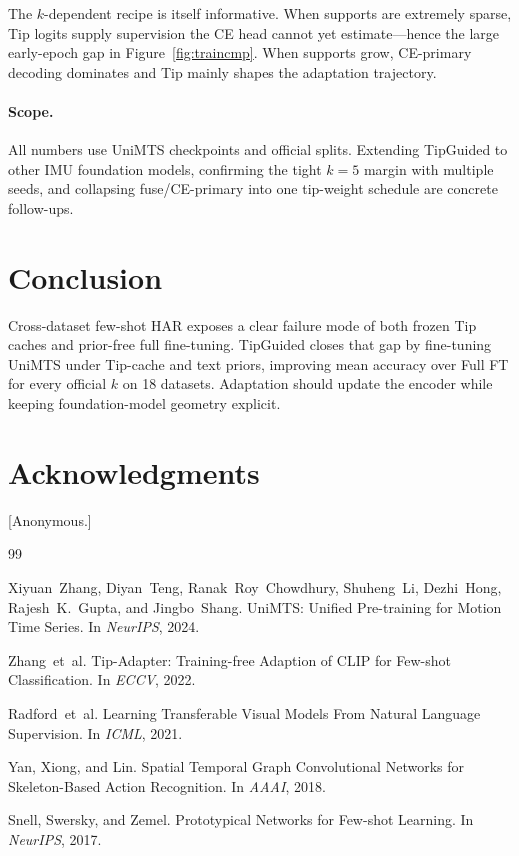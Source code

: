 \documentclass[11pt]{article}
\begin{document}
The \(k\)-dependent recipe is itself informative.
When supports are extremely sparse, Tip logits supply supervision the CE head cannot yet estimate---hence the large early-epoch gap in Figure~\ref{fig:traincmp}.
When supports grow, CE-primary decoding dominates and Tip mainly shapes the adaptation trajectory.

\paragraph{Scope.}
All numbers use UniMTS checkpoints and official splits.
Extending TipGuided to other IMU foundation models, confirming the tight \(k{=}5\) margin with multiple seeds, and collapsing fuse/CE-primary into one tip-weight schedule are concrete follow-ups.

\section{Conclusion}
\label{sec:conc}

Cross-dataset few-shot HAR exposes a clear failure mode of both frozen Tip caches and prior-free full fine-tuning.
TipGuided closes that gap by fine-tuning UniMTS under Tip-cache and text priors, improving mean accuracy over Full FT for every official \(k\) on 18 datasets.
Adaptation should update the encoder while keeping foundation-model geometry explicit.

\section*{Acknowledgments}
[Anonymous.]


\begin{thebibliography}{99}

Xiyuan~Zhang, Diyan~Teng, Ranak~Roy~Chowdhury, Shuheng~Li, Dezhi~Hong, Rajesh~K.~Gupta, and Jingbo~Shang.
\newblock UniMTS: Unified Pre-training for Motion Time Series.
\newblock In {\em NeurIPS}, 2024.

Zhang~et~al.
\newblock Tip-Adapter: Training-free Adaption of CLIP for Few-shot Classification.
\newblock In {\em ECCV}, 2022.

Radford~et~al.
\newblock Learning Transferable Visual Models From Natural Language Supervision.
\newblock In {\em ICML}, 2021.

Yan, Xiong, and Lin.
\newblock Spatial Temporal Graph Convolutional Networks for Skeleton-Based Action Recognition.
\newblock In {\em AAAI}, 2018.

Snell, Swersky, and Zemel.
\newblock Prototypical Networks for Few-shot Learning.
\newblock In {\em NeurIPS}, 2017.

\end{thebibliography}
\end{document}
